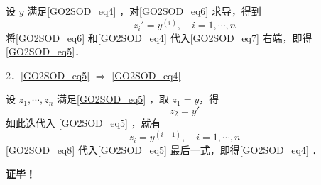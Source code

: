 设 $y$ 满足\autoref{GO2SOD_eq4} ，对\autoref{GO2SOD_eq6} 求导，得到
\begin{equation}\label{GO2SOD_eq7}
z_i'=y^{(i)},\quad i=1,\cdots,n
\end{equation}
将\autoref{GO2SOD_eq6} 和\autoref{GO2SOD_eq4} 代入\autoref{GO2SOD_eq7} 右端，即得\autoref{GO2SOD_eq5}．

2．\autoref{GO2SOD_eq5} $\Rightarrow$ \autoref{GO2SOD_eq4} 

设 $z_1,\cdots,z_n$ 满足\autoref{GO2SOD_eq5} ，取 $z_1=y$，得
\begin{equation}
z_2=y'
\end{equation}
如此迭代入 \autoref{GO2SOD_eq5} ，就有
\begin{equation}\label{GO2SOD_eq8}
z_i=y^{(i-1)},\quad i=1,\cdots,n
\end{equation}
\autoref{GO2SOD_eq8} 代入\autoref{GO2SOD_eq5} 最后一式，即得\autoref{GO2SOD_eq4} ．

\textbf{证毕！}

